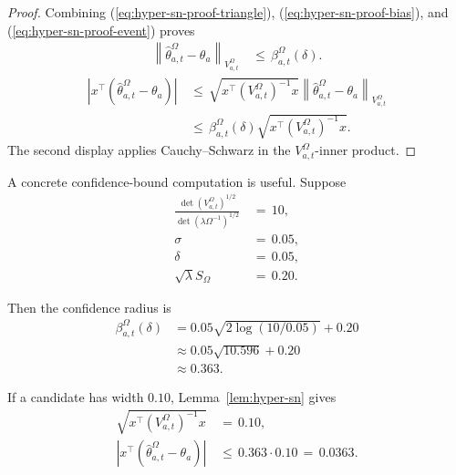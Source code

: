 \documentclass{article} %
\renewcommand{\eqref}[1]{\textup{(\ref{#1})}}
\begin{document}
\begin{proof}
Combining \eqref{eq:hyper-sn-proof-triangle}, \eqref{eq:hyper-sn-proof-bias}, and \eqref{eq:hyper-sn-proof-event} proves
\begin{equation}
\label{eq:hyper-sn-proof-param}
\begin{aligned}
\left\|
\widehat{\theta}_{a,t}^{\Omega}-\theta_a
\right\|_{V_{a,t}^{\Omega}}
&\,\leq\,
\beta_{a,t}^{\Omega}(\delta).
\end{aligned}
\end{equation}
\begin{equation}
\label{eq:hyper-sn-proof-pred}
\begin{aligned}
\left|
x^\top
\left(
\widehat{\theta}_{a,t}^{\Omega}-\theta_a
\right)
\right|
&\,\leq\,
\sqrt{x^\top\left(V_{a,t}^{\Omega}\right)^{-1}x}
\left\|
\widehat{\theta}_{a,t}^{\Omega}-\theta_a
\right\|_{V_{a,t}^{\Omega}}
\\
&\,\leq\,
\beta_{a,t}^{\Omega}(\delta)
\sqrt{x^\top\left(V_{a,t}^{\Omega}\right)^{-1}x}.
\end{aligned}
\end{equation}
The second display applies Cauchy--Schwarz in the
\(V_{a,t}^{\Omega}\)-inner product.
\end{proof}

A concrete confidence-bound computation is useful. Suppose
\begin{align}
\frac{
\det(V_{a,t}^{\Omega})^{1/2}
}{
\det(\lambda\Omega^{-1})^{1/2}
}
&\,=\,
10,
\label{eq:hyper-bound-example-det-ratio}
\\
\sigma
&\,=\,
0.05,
\label{eq:hyper-bound-example-sigma}
\\
\delta
&\,=\,
0.05,
\label{eq:hyper-bound-example-delta}
\\
\sqrt{\lambda}S_{\Omega}
&\,=\,
0.20.
\label{eq:hyper-bound-example-bias}
\end{align}

Then the confidence radius is
\begin{equation}
\label{eq:hyper-bound-example-beta}
\begin{aligned}
\beta_{a,t}^{\Omega}(\delta)
&=
0.05
\sqrt{
2\log(10/0.05)
}
+
0.20
\\
&\approx
0.05\sqrt{10.596}+0.20
\\
&\approx
0.363 .
\end{aligned}
\end{equation}

If a candidate has width \(0.10\), Lemma~\ref{lem:hyper-sn} gives
\begin{align}
\sqrt{x^\top(V_{a,t}^{\Omega})^{-1}x}
&\,=\,
0.10,
\label{eq:hyper-bound-example-width}
\\
\left|
x^\top
\left(
\widehat{\theta}_{a,t}^{\Omega}-\theta_a
\right)
\right|
&\,\leq\,
0.363\cdot 0.10
\,=\,
0.0363.
\label{eq:hyper-bound-example-pred}
\end{align}
\end{document}
